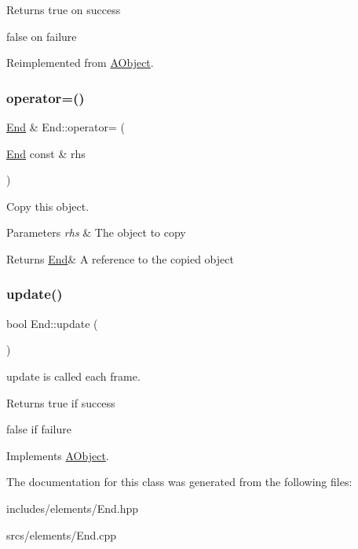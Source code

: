 \begin{DoxyReturn}{Returns}
true on success 

false on failure 
\end{DoxyReturn}


Reimplemented from \hyperlink{class_a_object_afa83ef1c900a47453524219788327b86}{A\+Object}.

\mbox{\label{class_end_a52c805a4ff7a6477b25bb270effd0638}} 
\subsubsection{\texorpdfstring{operator=()}{operator=()}}
{\footnotesize\ttfamily \hyperlink{class_end}{End} \& End\+::operator= (\begin{DoxyParamCaption}\item[{\hyperlink{class_end}{End} const \&}]{rhs }\end{DoxyParamCaption})}



Copy this object. 


\begin{DoxyParams}{Parameters}
{\em rhs} & The object to copy \\
\hline
\end{DoxyParams}
\begin{DoxyReturn}{Returns}
\hyperlink{class_end}{End}\& A reference to the copied object 
\end{DoxyReturn}
\mbox{\label{class_end_a7154532cce1c86f4f5bfa98eb0c25574}} 
\subsubsection{\texorpdfstring{update()}{update()}}
{\footnotesize\ttfamily bool End\+::update (\begin{DoxyParamCaption}{ }\end{DoxyParamCaption})\hspace{0.3cm}{\ttfamily [virtual]}}



update is called each frame. 

\begin{DoxyReturn}{Returns}
true if success 

false if failure 
\end{DoxyReturn}


Implements \hyperlink{class_a_object_af35bb4b68af0a11bb1fcf617bde41ecd}{A\+Object}.



The documentation for this class was generated from the following files\+:\begin{DoxyCompactItemize}
\item 
includes/elements/End.\+hpp\item 
srcs/elements/End.\+cpp\end{DoxyCompactItemize}
